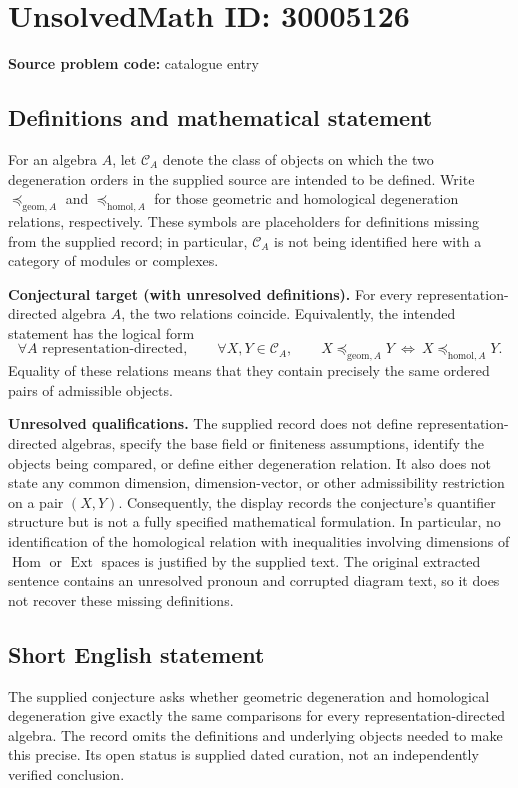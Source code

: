 \documentclass[11pt]{article}
\begin{document}
\section*{UnsolvedMath ID: 30005126}
\textbf{Source problem code:} catalogue entry
\subsection{Definitions and mathematical statement}
For an algebra \(A\), let \(\mathcal C_A\) denote the class of objects on which the two degeneration orders in the supplied source are intended to be defined. Write \(\preccurlyeq_{\mathrm{geom},A}\) and \(\preccurlyeq_{\mathrm{homol},A}\) for those geometric and homological degeneration relations, respectively. These symbols are placeholders for definitions missing from the supplied record; in particular, \(\mathcal C_A\) is not being identified here with a category of modules or complexes.

\textbf{Conjectural target (with unresolved definitions).} For every representation-directed algebra \(A\), the two relations coincide. Equivalently, the intended statement has the logical form
\[
\forall A\text{ representation-directed},\qquad
\forall X,Y\in\mathcal C_A,\qquad
X\preccurlyeq_{\mathrm{geom},A}Y
\ \Longleftrightarrow\ 
X\preccurlyeq_{\mathrm{homol},A}Y.
\]
Equality of these relations means that they contain precisely the same ordered pairs of admissible objects.

\textbf{Unresolved qualifications.} The supplied record does not define representation-directed algebras, specify the base field or finiteness assumptions, identify the objects being compared, or define either degeneration relation. It also does not state any common dimension, dimension-vector, or other admissibility restriction on a pair \((X,Y)\). Consequently, the display records the conjecture's quantifier structure but is not a fully specified mathematical formulation. In particular, no identification of the homological relation with inequalities involving dimensions of \(\operatorname{Hom}\) or \(\operatorname{Ext}\) spaces is justified by the supplied text. The original extracted sentence contains an unresolved pronoun and corrupted diagram text, so it does not recover these missing definitions.
\subsection{Short English statement}
The supplied conjecture asks whether geometric degeneration and homological degeneration give exactly the same comparisons for every representation-directed algebra. The record omits the definitions and underlying objects needed to make this precise. Its open status is supplied dated curation, not an independently verified conclusion.
\end{document}
